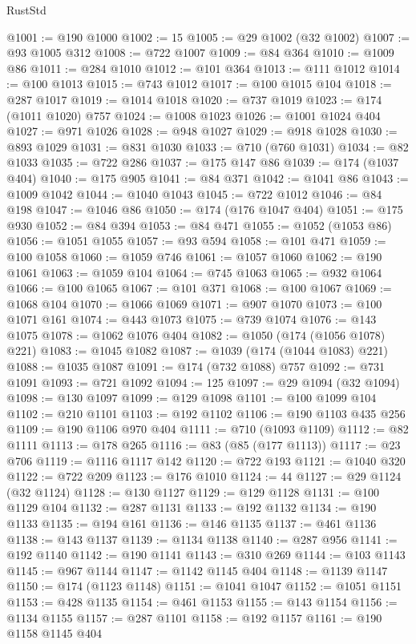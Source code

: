 \begin{lexlean}{RustStd}
\begin{coremodule}
@1001 := @190 @1000
@1002 := 15
@1005 := @29 @1002 (@32 @1002)
@1007 := @93 @1005 @312
@1008 := @722 @1007
@1009 := @84 @364
@1010 := @1009 @86
@1011 := @284 @1010
@1012 := @101 @364
@1013 := @111 @1012
@1014 := @100 @1013
@1015 := @743 @1012
@1017 := @100 @1015 @104
@1018 := @287 @1017
@1019 := @1014 @1018
@1020 := @737 @1019
@1023 := @174 (@1011 @1020) @757
@1024 := @1008 @1023
@1026 := @1001 @1024 @404
@1027 := @971 @1026
@1028 := @948 @1027
@1029 := @918 @1028
@1030 := @893 @1029
@1031 := @831 @1030
@1033 := @710 (@760 @1031)
@1034 := @82 @1033
@1035 := @722 @286
@1037 := @175 @147 @86
@1039 := @174 (@1037 @404)
@1040 := @175 @905
@1041 := @84 @371
@1042 := @1041 @86
@1043 := @1009 @1042
@1044 := @1040 @1043
@1045 := @722 @1012
@1046 := @84 @198
@1047 := @1046 @86
@1050 := @174 (@176 @1047 @404)
@1051 := @175 @930
@1052 := @84 @394
@1053 := @84 @471
@1055 := @1052 (@1053 @86)
@1056 := @1051 @1055
@1057 := @93 @594
@1058 := @101 @471
@1059 := @100 @1058
@1060 := @1059 @746
@1061 := @1057 @1060
@1062 := @190 @1061
@1063 := @1059 @104
@1064 := @745 @1063
@1065 := @932 @1064
@1066 := @100 @1065
@1067 := @101 @371
@1068 := @100 @1067
@1069 := @1068 @104
@1070 := @1066 @1069
@1071 := @907 @1070
@1073 := @100 @1071 @161
@1074 := @443 @1073
@1075 := @739 @1074
@1076 := @143 @1075
@1078 := @1062 @1076 @404
@1082 := @1050 (@174 (@1056 @1078) @221)
@1083 := @1045 @1082
@1087 := @1039 (@174 (@1044 @1083) @221)
@1088 := @1035 @1087
@1091 := @174 (@732 @1088) @757
@1092 := @731 @1091
@1093 := @721 @1092
@1094 := 125
@1097 := @29 @1094 (@32 @1094)
@1098 := @130 @1097
@1099 := @129 @1098
@1101 := @100 @1099 @104
@1102 := @210 @1101
@1103 := @192 @1102
@1106 := @190 @1103 @435 @256
@1109 := @190 @1106 @970 @404
@1111 := @710 (@1093 @1109)
@1112 := @82 @1111
@1113 := @178 @265
@1116 := @83 (@85 (@177 @1113))
@1117 := @23 @706
@1119 := @1116 @1117 @142
@1120 := @722 @193
@1121 := @1040 @320
@1122 := @722 @209
@1123 := @176 @1010
@1124 := 44
@1127 := @29 @1124 (@32 @1124)
@1128 := @130 @1127
@1129 := @129 @1128
@1131 := @100 @1129 @104
@1132 := @287 @1131
@1133 := @192 @1132
@1134 := @190 @1133
@1135 := @194 @161
@1136 := @146 @1135
@1137 := @461 @1136
@1138 := @143 @1137
@1139 := @1134 @1138
@1140 := @287 @956
@1141 := @192 @1140
@1142 := @190 @1141
@1143 := @310 @269
@1144 := @103 @1143
@1145 := @967 @1144
@1147 := @1142 @1145 @404
@1148 := @1139 @1147
@1150 := @174 (@1123 @1148)
@1151 := @1041 @1047
@1152 := @1051 @1151
@1153 := @428 @1135
@1154 := @461 @1153
@1155 := @143 @1154
@1156 := @1134 @1155
@1157 := @287 @1101
@1158 := @192 @1157
@1161 := @190 @1158 @1145 @404

\end{coremodule}
\end{lexlean}

